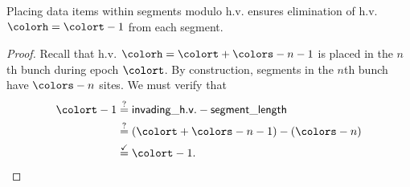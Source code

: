 \begin{lemma}
Placing data items within segments modulo h.v. ensures elimination of h.v. $\colorh = \colort - 1$ from each segment.
\end{lemma} \label{thm:steady-hv-elimination}
\begin{proof}
Recall that h.v. $\colorh = \colort + \colors - n - 1$ is placed in the $n$th bunch during epoch $\colort$.
By construction, segments in the $n$th bunch have $\colors - n$ sites.
We must verify that
\begin{align*}
\colort - 1
&\stackrel{?}{=}
\mathsf{invading\_h.v.} - \mathsf{segment\_length}\\
&\stackrel{?}{=}
(\colort + \colors - n - 1) - (\colors - n)
 \\
&\stackrel{\checkmark}{=} \colort - 1.
\end{align*}
\end{proof}

